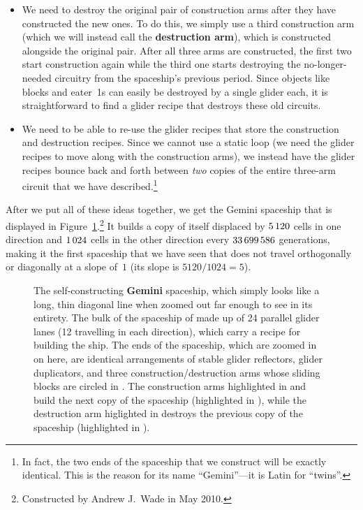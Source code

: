 \begin{itemize}
	\item We need to destroy the original pair of construction arms after they have constructed the new ones. To do this, we simply use a third construction arm (which we will instead call the \textbf{destruction arm}), which is constructed alongside the original pair. After all three arms are constructed, the first two start construction again while the third one starts destroying the no-longer-needed circuitry from the spaceship's previous period. Since objects like blocks and eater~1s can easily be destroyed by a single glider each, it is straightforward to find a glider recipe that destroys these old circuits.\smallskip
	
	\item We need to be able to re-use the glider recipes that store the construction and destruction recipes. Since we cannot use a static loop (we need the glider recipes to move along with the construction arms), we instead have the glider recipes bounce back and forth between \emph{two} copies of the entire three-arm circuit that we have described.\footnote{In fact, the two ends of the spaceship that we construct will be exactly identical. This is the reason for its name ``Gemini''---it is Latin for ``twins''.}\smallskip
\end{itemize}

After we put all of these ideas together, we get the Gemini spaceship that is displayed in Figure~\ref{fig:gemini}.\footnote{Constructed by Andrew J.~Wade in May 2010.} It builds a copy of itself displaced by $5{\,}120$ cells in one direction and $1{\,}024$ cells in the other direction every $33{\,}699{\,}586$ generations, making it the first spaceship that we have seen that does not travel orthogonally or diagonally at a slope of~$1$ (its slope is $5120/1024 = 5$).

\begin{figure}[!htb]
	\centering
	\caption{The self-constructing \textbf{Gemini} spaceship, which simply looks like a long, thin diagonal line when zoomed out far enough to see in its entirety. The bulk of the spaceship of made up of 24 parallel glider lanes (12 travelling in each direction), which carry a recipe for building the ship. The ends of the spaceship, which are zoomed in on here, are identical arrangements of stable glider reflectors, glider duplicators, and three construction/destruction arms whose sliding blocks are circled in . The construction arms highlighted in  and  build the next copy of the spaceship (highlighted in ), while the destruction arm higlighted in  destroys the previous copy of the spaceship (highlighted in ).}\label{fig:gemini}
\end{figure}


